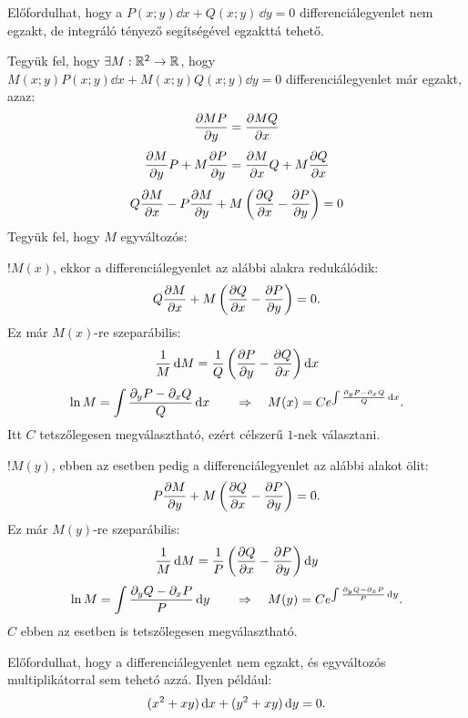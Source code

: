\begin{blueBox}
  Előfordulhat, hogy a $P(x;y)\dd x + Q(x;y) \,\dd y = 0$ differenciálegyenlet
  nem egzakt, de integráló tényező segítségével egzakttá tehető.

  Tegyük fel, hogy $\exists M : \mathbb{R}^2 \rightarrow \mathbb{R}$, hogy
  $M(x;y) P(x;y) \dd x + M(x;y) Q(x;y) \dd y = 0$ differenciálegyenlet már
  egzakt, azaz:
  \begin{gather*}
    \pdv{MP}{y} = \pdv{MQ}{x}
    \\[.33em]
    \pdv{M}{y} P
    + M \pdv{P}{y}
    = \pdv{M}{x} Q
    + M \pdv{Q}{x}
    \\[.33em]
    Q \pdv{M}{x}
    - P \pdv{M}{y}
    + M \left(
    \pdv{Q}{x}
    - \pdv{P}{y}
    \right) = 0
  \end{gather*}
  Tegyük fel, hogy $M$ egyváltozós:

  \boxrule

  $!M(x)$, ekkor a differenciálegyenlet az alábbi alakra redukálódik:
  $$
    Q \pdv{M}{x} + M \left( \pdv{Q}{x} - \pdv{P}{y} \right) = 0
    \text.
  $$
  Ez már $M(x)$-re szeparábilis:
  \begin{gather*}
    \frac{1}{M} \mathop{}\!\mathrm{d} M = \frac{1}{Q} \left( \pdv{P}{y} - \pdv{Q}{x} \right) \mathop{}\!\mathrm{d} x
    \\[.33em]
    \ln M = \int \frac{\partial_y P - \partial_x Q}{Q} \mathop{}\!\mathrm{d} x
    \qquad\Rightarrow\quad
    M(x) = C e^{\int \frac{\partial_y P - \partial_x Q}{Q} \mathop{}\!\mathrm{d} x}
    \text.
  \end{gather*}
  Itt $C$ tetszőlegesen megválasztható, ezért célszerű $1$-nek választani.

  \boxrule

  $!M(y)$, ebben az esetben pedig a differenciálegyenlet az alábbi alakot ölit:
  $$
    P \pdv{M}{y}
    + M \left(
    \pdv{Q}{x}
    - \pdv{P}{y}
    \right) = 0
    \text.
  $$
  Ez már $M(y)$-re szeparábilis:
  \begin{gather*}
    \frac{1}{M} \mathop{}\!\mathrm{d} M = \frac{1}{P} \left( \pdv{Q}{x} - \pdv{P}{y} \right) \mathop{}\!\mathrm{d} y
    \\[.33em]
    \ln M = \int \frac{\partial_y Q - \partial_x P}{P} \mathop{}\!\mathrm{d} y
    \qquad\Rightarrow\quad
    M(y) = Ce^{\int \frac{\partial_y Q - \partial_x P}{P} \mathop{}\!\mathrm{d} y}
    \text.
  \end{gather*}
  $C$ ebben az esetben is tetszőlegesen megválasztható.
\end{blueBox}

\begin{note}
  Előfordulhat, hogy a differenciálegyenlet nem egzakt, és egyváltozós
  multiplikátorral sem tehetó azzá. Ilyen például:
  $$
    (x^2 + xy) \mathop{}\!\mathrm{d} x + (y^2 + xy) \mathop{}\!\mathrm{d} y = 0
    \text.
  $$
\end{note}

